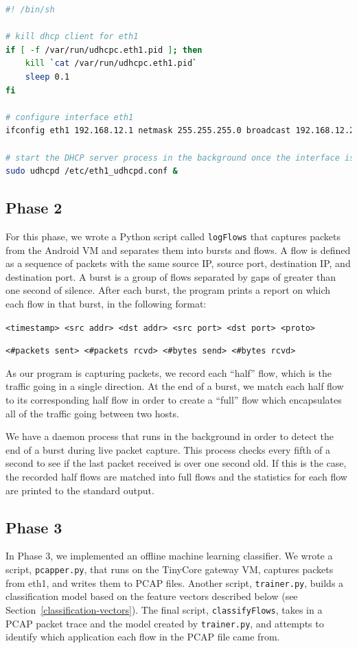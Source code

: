 \documentclass[a4paper, 11pt]{article} %
\begin{document}
\begin{lstlisting}[language=bash]
#! /bin/sh

# kill dhcp client for eth1
if [ -f /var/run/udhcpc.eth1.pid ]; then
    kill `cat /var/run/udhcpc.eth1.pid`
    sleep 0.1
fi

# configure interface eth1
ifconfig eth1 192.168.12.1 netmask 255.255.255.0 broadcast 192.168.12.255 up

# start the DHCP server process in the background once the interface is ready
sudo udhcpd /etc/eth1_udhcpd.conf &
\end{lstlisting}

\subsection{Phase 2}
\label{phase-2}

For this phase, we wrote a Python script called \texttt{logFlows} that captures
packets from the Android VM and separates them into bursts and flows. A flow is
defined as a sequence of packets with the same source IP, source port,
destination IP, and destination port. A burst is a group of flows separated by
gaps of greater than one second of silence. After each burst, the program prints
a report on which each flow in that burst, in the following format:

\noindent\texttt{<timestamp> <src addr> <dst addr> <src port> <dst port> <proto>}

\noindent\texttt{<\#packets sent> <\#packets rcvd> <\#bytes send> <\#bytes rcvd>}

As our program is capturing packets, we record each ``half'' flow, which is the
traffic going in a single direction. At the end of a burst, we match each half
flow to its corresponding half flow in order to create a ``full'' flow which
encapsulates all of the traffic going between two hosts.

We have a daemon process that runs in the background in order to detect the end
of a burst during live packet capture. This process checks every fifth of a
second to see if the last packet received is over one second old. If this is the
case, the recorded half flows are matched into full flows and the statistics for
each flow are printed to the standard output.

\subsection{Phase 3}

In Phase 3, we implemented an offline machine learning classifier. We wrote a
script, \texttt{pcapper.py}, that runs on the TinyCore gateway VM, captures
packets from eth1, and writes them to PCAP files. Another script,
\texttt{trainer.py}, builds a classification model based on the feature vectors
described below (see Section~\ref{classification-vectors}). The final script,
\texttt{classifyFlows}, takes in a PCAP packet trace and the model created by
\texttt{trainer.py}, and attempts to identify which application each flow in the
PCAP file came from.
\end{document}
